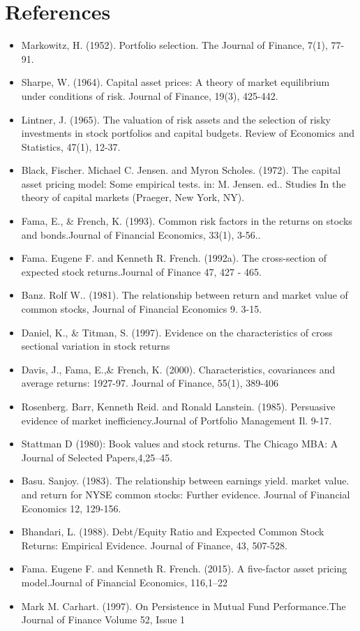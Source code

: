 \documentclass[12pt]{article}
\begin{document}
	\section{References} %
\begin{itemize}
	\item Markowitz, H. (1952). Portfolio selection. The Journal of Finance, 7(1), 77-91.
	\item Sharpe, W. (1964). Capital asset prices: A theory of market equilibrium under conditions of risk. Journal of Finance, 19(3), 425-442.
	\item Lintner, J. (1965). The valuation of risk assets and the selection of risky investments in stock portfolios and capital budgets. Review of Economics and Statistics, 47(1), 12-37.
	\item Black, Fischer. Michael C. Jensen. and Myron Scholes. (1972). The capital asset pricing model: Some empirical tests. in: M. Jensen. ed.. Studies In the theory of capital markets (Praeger, New York, NY).
	\item Fama, E., \& French, K. (1993). Common risk factors in the returns on stocks and bonds.Journal of Financial Economics, 33(1), 3-56..
	\item Fama. Eugene F. and Kenneth R. French. (1992a). The cross-section of expected stock returns.Journal of Finance 47, 427 - 465.
	\item Banz. Rolf W.. (1981). The relationship between return and market value of common stocks, Journal	of Financial Economics 9. 3-15.
	\item Daniel, K., \& Titman, S. (1997). Evidence on the characteristics of cross sectional variation in stock returns
	\item Davis, J., Fama, E.,\& French, K. (2000). Characteristics, covariances and average returns: 1927-97. Journal of Finance, 55(1), 389-406
	\item Rosenberg. Barr, Kenneth Reid. and Ronald Lanstein. (1985). Persuasive evidence of market inefficiency.Journal of Portfolio Management Il. 9-17.
	\item Stattman D (1980): Book values and stock returns. The Chicago MBA: A Journal of Selected Papers,4,25–45. 
	\item Basu. Sanjoy. (1983). The relationship between earnings yield. market value. and return for NYSE common stocks: Further evidence. Journal of Financial Economics 12, 129-156.
	\item Bhandari, L. (1988). Debt/Equity Ratio and Expected Common Stock Returns: Empirical Evidence. Journal of Finance, 43, 507-528. 
	\item Fama. Eugene F. and Kenneth R. French. (2015). A five-factor asset pricing model.Journal of Financial Economics, 116,1–22
	\item Mark M. Carhart. (1997). On Persistence in Mutual Fund Performance.The Journal of Finance Volume 52, Issue 1
\end{itemize}
\end{document}
